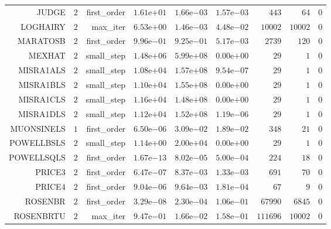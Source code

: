 \begin{longtable}{rrrrrrrrr}
JUDGE & \(     2\) & first\_order & \( 1.61\)e\(+01\) & \( 1.66\)e\(-03\) & \( 1.57\)e\(-03\) & \(   443\) & \(    64\) & \(     0\) \\
LOGHAIRY & \(     2\) & max\_iter & \( 6.53\)e\(+00\) & \( 1.46\)e\(-03\) & \( 4.48\)e\(-02\) & \( 10002\) & \( 10002\) & \(     0\) \\
MARATOSB & \(     2\) & first\_order & \( 9.96\)e\(-01\) & \( 9.25\)e\(-01\) & \( 5.17\)e\(-03\) & \(  2739\) & \(   120\) & \(     0\) \\
MEXHAT & \(     2\) & small\_step & \( 1.48\)e\(+06\) & \( 5.99\)e\(+08\) & \( 0.00\)e\(+00\) & \(    29\) & \(     1\) & \(     0\) \\
MISRA1ALS & \(     2\) & small\_step & \( 1.08\)e\(+04\) & \( 1.57\)e\(+08\) & \( 9.54\)e\(-07\) & \(    29\) & \(     1\) & \(     0\) \\
MISRA1BLS & \(     2\) & small\_step & \( 1.10\)e\(+04\) & \( 1.55\)e\(+08\) & \( 0.00\)e\(+00\) & \(    29\) & \(     1\) & \(     0\) \\
MISRA1CLS & \(     2\) & small\_step & \( 1.16\)e\(+04\) & \( 1.48\)e\(+08\) & \( 0.00\)e\(+00\) & \(    29\) & \(     1\) & \(     0\) \\
MISRA1DLS & \(     2\) & small\_step & \( 1.12\)e\(+04\) & \( 1.52\)e\(+08\) & \( 1.19\)e\(-06\) & \(    29\) & \(     1\) & \(     0\) \\
MUONSINELS & \(     1\) & first\_order & \( 6.50\)e\(-06\) & \( 3.09\)e\(-02\) & \( 1.89\)e\(-02\) & \(   348\) & \(    21\) & \(     0\) \\
POWELLBSLS & \(     2\) & small\_step & \( 1.14\)e\(+00\) & \( 2.00\)e\(+04\) & \( 0.00\)e\(+00\) & \(    29\) & \(     1\) & \(     0\) \\
POWELLSQLS & \(     2\) & first\_order & \( 1.67\)e\(-13\) & \( 8.02\)e\(-05\) & \( 5.00\)e\(-04\) & \(   224\) & \(    18\) & \(     0\) \\
PRICE3 & \(     2\) & first\_order & \( 6.47\)e\(-07\) & \( 8.37\)e\(-03\) & \( 1.33\)e\(-03\) & \(   691\) & \(    70\) & \(     0\) \\
PRICE4 & \(     2\) & first\_order & \( 9.04\)e\(-06\) & \( 9.64\)e\(-03\) & \( 1.81\)e\(-04\) & \(    67\) & \(     9\) & \(     0\) \\
ROSENBR & \(     2\) & first\_order & \( 3.29\)e\(-08\) & \( 2.30\)e\(-04\) & \( 1.06\)e\(-01\) & \( 67990\) & \(  6845\) & \(     0\) \\
ROSENBRTU & \(     2\) & max\_iter & \( 9.47\)e\(-01\) & \( 1.66\)e\(-02\) & \( 1.58\)e\(-01\) & \(111696\) & \( 10002\) & \(     0\) \\

\end{longtable}
